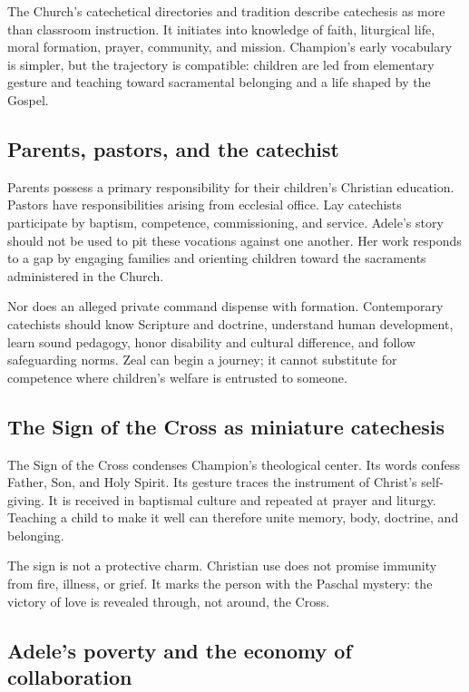 The Church's catechetical directories and tradition describe catechesis as more than classroom instruction. It initiates into knowledge of faith, liturgical life, moral formation, prayer, community, and mission. Champion's early vocabulary is simpler, but the trajectory is compatible: children are led from elementary gesture and teaching toward sacramental belonging and a life shaped by the Gospel.

\subsection{Parents, pastors, and the catechist}

Parents possess a primary responsibility for their children's Christian education. Pastors have responsibilities arising from ecclesial office. Lay catechists participate by baptism, competence, commissioning, and service. Adele's story should not be used to pit these vocations against one another. Her work responds to a gap by engaging families and orienting children toward the sacraments administered in the Church.

Nor does an alleged private command dispense with formation. Contemporary catechists should know Scripture and doctrine, understand human development, learn sound pedagogy, honor disability and cultural difference, and follow safeguarding norms. Zeal can begin a journey; it cannot substitute for competence where children's welfare is entrusted to someone.

\subsection{The Sign of the Cross as miniature catechesis}

The Sign of the Cross condenses Champion's theological center. Its words confess Father, Son, and Holy Spirit. Its gesture traces the instrument of Christ's self-giving. It is received in baptismal culture and repeated at prayer and liturgy. Teaching a child to make it well can therefore unite memory, body, doctrine, and belonging.

The sign is not a protective charm. Christian use does not promise immunity from fire, illness, or grief. It marks the person with the Paschal mystery: the victory of love is revealed through, not around, the Cross.

\subsection{Adele's poverty and the economy of collaboration}


